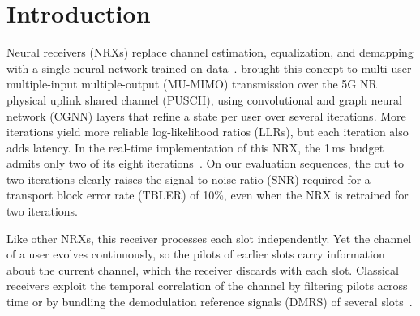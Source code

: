 \section{Introduction}
Neural receivers (NRXs) replace channel estimation, equalization, and demapping with a single neural network trained on data~\cite{honkala2021deeprx}. \citet{cammerer2023neural} brought this concept to multi-user multiple-input multiple-output (MU-MIMO) transmission over the 5G NR physical uplink shared channel (PUSCH), using convolutional and graph neural network (CGNN) layers that refine a state per user over several iterations. More iterations yield more reliable log-likelihood ratios (LLRs), but each iteration also adds latency. In the real-time implementation of this NRX, the 1\,ms budget admits only two of its eight iterations~\cite{wiesmayr2025realtime}. On our evaluation sequences, the cut to two iterations clearly raises the signal-to-noise ratio (SNR) required for a transport block error rate (TBLER) of 10\%, even when the NRX is retrained for two iterations.

Like other NRXs, this receiver processes each slot independently. Yet the channel of a user evolves continuously, so the pilots of earlier slots carry information about the current channel, which the receiver discards with each slot. Classical receivers exploit the temporal correlation of the channel by filtering pilots across time or by bundling the demodulation reference signals (DMRS) of several slots~\cite{hoeher1997wiener,3gpp38214}. 

